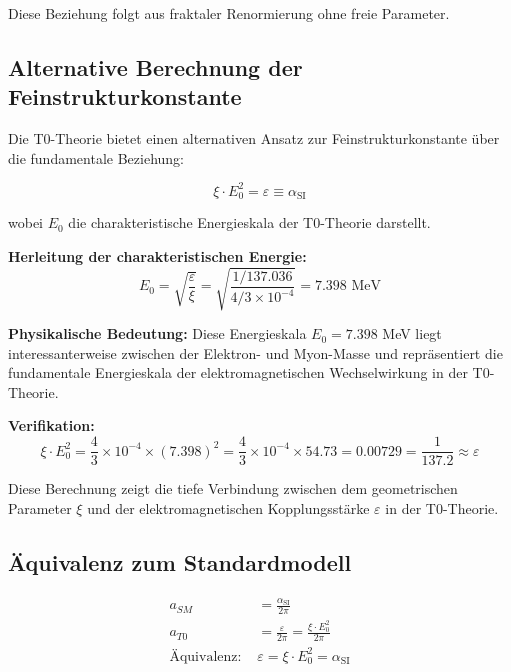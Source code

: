 \documentclass[12pt,a4paper]{article}
\numberwithin{equation}{section}
\newcommand{\xipar}{\xi}
\newcommand{\epsilonT}{\varepsilon}
\newcommand{\alphaSI}{\alpha_{\text{SI}}}
\newcommand{\Eo}{E_0}
\begin{document}
	Diese Beziehung folgt aus fraktaler Renormierung ohne freie Parameter.
	
	\subsection{Alternative Berechnung der Feinstrukturkonstante}
	
	Die T0-Theorie bietet einen alternativen Ansatz zur Feinstrukturkonstante über die fundamentale Beziehung:
	
	\begin{equation}
		\xipar \cdot \Eo^2 = \epsilonT \equiv \alphaSI
		\label{eq:alpha_alternative}
	\end{equation}
	
	wobei $\Eo$ die charakteristische Energieskala der T0-Theorie darstellt.
	
	\textbf{Herleitung der charakteristischen Energie:}
	\begin{equation}
		\Eo = \sqrt{\frac{ \epsilonT}{\xipar}} = \sqrt{\frac{1/137.036}{4/3 \times 10^{-4}}} = 7.398 \text{ MeV}
		\label{eq:e0_derivation}
	\end{equation}
	
	\textbf{Physikalische Bedeutung:}
	Diese Energieskala $\Eo = 7.398$ MeV liegt interessanterweise zwischen der Elektron- und Myon-Masse und repräsentiert die fundamentale Energieskala der elektromagnetischen Wechselwirkung in der T0-Theorie.
	
	\textbf{Verifikation:}
	\begin{equation}
		\xipar \cdot \Eo^2 = \frac{4}{3} \times 10^{-4} \times (7.398)^2 = \frac{4}{3} \times 10^{-4} \times 54.73 = 0.00729 = \frac{1}{137.2} \approx  \epsilonT
		\label{eq:alpha_verification}
	\end{equation}
	
	Diese Berechnung zeigt die tiefe Verbindung zwischen dem geometrischen Parameter $\xipar$ und der elektromagnetischen Kopplungsstärke $ \epsilonT$ in der T0-Theorie.
	
	\subsection{Äquivalenz zum Standardmodell}
	
	\begin{align}
		a_{SM} &= \frac{\alphaSI}{2\pi} \\
		a_{T0} &= \frac{\epsilonT}{2\pi} = \frac{\xipar \cdot \Eo^2}{2\pi} \\
		\text{Äquivalenz: } &\epsilonT = \xipar \cdot \Eo^2 = \alphaSI
	\end{align}
	
\end{document}
